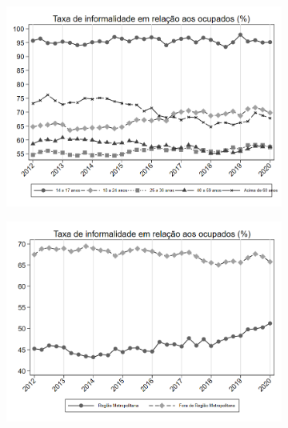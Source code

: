 \documentclass[11pt]{beamer}
\begin{document}
\begin{frame}
\begin{figure}[h!tpb]
\begin{subfigure}{.5\textwidth}
  \centering
  \includegraphics[width=.95\linewidth]{../../analysis/output/composicao_demografica/faixa_etaria/_composicao_demografica_faixa_etaria_taxa_de_informalidade.png}
  \label{fig:_composicao_demografica_faixa_etaria_taxa_de_informalidade}
\end{subfigure}%
\begin{subfigure}{.5\textwidth}
  \centering
  \includegraphics[width=.95\linewidth]{../../analysis/output/composicao_demografica/area_geografica/_composicao_demografica_regiao_metro_taxa_de_informalidade.png}
  \label{fig:_composicao_demografica_regiao_metro_taxa_de_informalidade}
\end{subfigure}

\label{fig:composicao_demografica}
\end{figure}
\end{frame}
\end{document}
